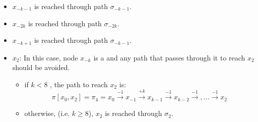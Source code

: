 \begin{itemize}
\begin{itemize}
\item $x_{-k-1}$ is reached through path  $ \sigma_{-k-1}$.

\item \noindent  $x_{-2k}$ is reached through path $ \sigma_{-2k}$.  %
 

\item \noindent  $x_{-k+1}$ is reached through path $ \sigma_{-k-1}$.
% 

\item  $x_{2}$: In this case, node $x_{-k}$ is a \bv and any path that passes through it to reach $x_2$ should be avoided.
\begin{itemize}
\item if $k < 8$ , the path to reach $x_2$ is:
$$ \pi[x_0,x_{2}] =    \pi_{4} = x_{0} \xrightarrow {-1} x_{-1} \xrightarrow {+k} x_{k-1} \xrightarrow {-1} x_{k-2} \xrightarrow {-1},... \xrightarrow {-1} x_{2}$$

\item otherwise, (i.e. $k \ge 8$), $x_2$ is reached through $ \sigma_{2}$.
%
%
\end{itemize}
\end{itemize}
\end{itemize}


